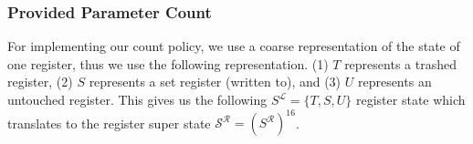 %
%
%

\subsubsection{Provided Parameter Count}
\label{subsection:providedparamcount}
For implementing our {count} policy, we use a coarse representation of the state of one register, thus we use the following representation.
(1) $T$ represents a trashed register,
(2) $S$ represents a set register (written to), and
(3) $U$ represents an untouched register.
This gives us the following $S^\mathcal{L} = \{ T, S, U \}$  register state which translates to the register super state $\mathcal{S}^\mathcal{R} = (S^\mathcal{R})^{16}$.

